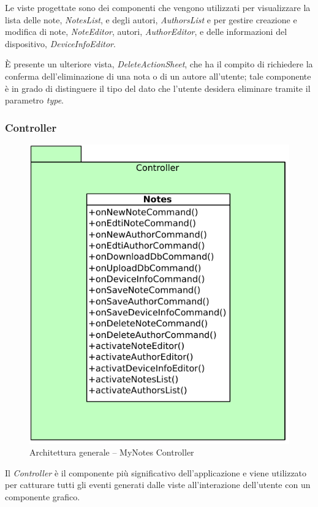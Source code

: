Le viste progettate sono dei componenti che vengono utilizzati per visualizzare la lista delle note, \emph{NotesList}, e degli autori, \emph{AuthorsList} e per gestire creazione e modifica di note, \emph{NoteEditor}, autori, \emph{AuthorEditor}, e delle informazioni del dispositivo, \emph{DeviceInfoEditor}.

È presente un ulteriore vista, \emph{DeleteActionSheet}, che ha il compito di richiedere la conferma dell'eliminazione di una nota o di un autore all'utente; tale componente è in grado di distinguere il tipo del dato che l'utente desidera eliminare tramite il parametro \emph{type}.

\subsubsection{Controller}
\begin{figure}[htb]
\centering
\includegraphics[scale=0.6]{gfx/class/MyNotes_Controller.pdf}
\caption{Architettura generale -- MyNotes Controller}
\label{fig:architettura MyNotes Controller}
\end{figure}

Il \emph{Controller} è il componente più significativo dell'applicazione e viene utilizzato per catturare tutti gli eventi generati dalle viste all'interazione dell'utente con un componente grafico.

